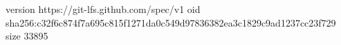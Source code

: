 version https://git-lfs.github.com/spec/v1
oid sha256:c32f6c874f7a695c815f1271da0c549d97836382ea3c1829c9ad1237cc23f729
size 33895
